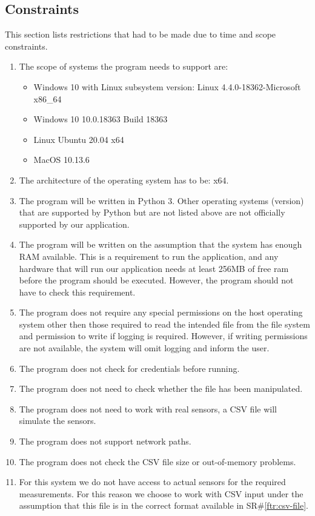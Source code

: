 \documentclass[a4paper]{article}
\begin{document}
\clearpage
\subsection{Constraints}
\label{sec:constraints}
This section lists restrictions that had to be made due to time and scope constraints.

\begin{enumerate}
    \item The scope of systems the program needs to support are:
    \begin{itemize}
        \item Windows 10 with Linux subsystem version: Linux 4.4.0-18362-Microsoft x86\_64
        \item Windows 10 10.0.18363 Build 18363
        \item Linux Ubuntu 20.04 x64
        \item MacOS 10.13.6
    \end{itemize}
    \item The architecture of the operating system has to be: x64.
    \item The program will be written in Python 3. Other operating systems (version) that are supported by Python but are not listed above are not officially supported by our application.
    \item The program will be written on the assumption that the system has enough RAM available. This is a requirement to run the application, and any hardware that will run our application needs at least 256MB of free ram before the program should be executed. However, the program should not have to check this requirement.
    \item The program does not require any special permissions on the host operating system other then those required to read the intended file from the file system and permission to write if logging is required. However, if writing permissions are not available, the system will omit logging and inform the user.
    \item The program does not check for credentials before running.
    \item The program does not need to check whether the file has been manipulated. 
    \item The program does not need to work with real sensors, a CSV file will simulate the sensors.
    \item The program does not support network paths.
    \item The program does not check the CSV file size or out-of-memory problems. 
    \item For this system we do not have access to actual sensors for the required measurements. For this reason we choose to work with CSV input under the assumption that this file is in the correct format available in SR\#\ref{ftr:csv-file}.
\end{enumerate}
\end{document}
